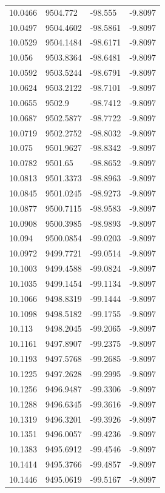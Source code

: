 \begin{table}[H]
\begin{tabular}{llll}
10.0466 & 9504.772 & -98.555 & -9.8097 \\
10.0497 & 9504.4602 & -98.5861 & -9.8097 \\
10.0529 & 9504.1484 & -98.6171 & -9.8097 \\
10.056 & 9503.8364 & -98.6481 & -9.8097 \\
10.0592 & 9503.5244 & -98.6791 & -9.8097 \\
10.0624 & 9503.2122 & -98.7101 & -9.8097 \\
10.0655 & 9502.9 & -98.7412 & -9.8097 \\
10.0687 & 9502.5877 & -98.7722 & -9.8097 \\
10.0719 & 9502.2752 & -98.8032 & -9.8097 \\
10.075 & 9501.9627 & -98.8342 & -9.8097 \\
10.0782 & 9501.65 & -98.8652 & -9.8097 \\
10.0813 & 9501.3373 & -98.8963 & -9.8097 \\
10.0845 & 9501.0245 & -98.9273 & -9.8097 \\
10.0877 & 9500.7115 & -98.9583 & -9.8097 \\
10.0908 & 9500.3985 & -98.9893 & -9.8097 \\
10.094 & 9500.0854 & -99.0203 & -9.8097 \\
10.0972 & 9499.7721 & -99.0514 & -9.8097 \\
10.1003 & 9499.4588 & -99.0824 & -9.8097 \\
10.1035 & 9499.1454 & -99.1134 & -9.8097 \\
10.1066 & 9498.8319 & -99.1444 & -9.8097 \\
10.1098 & 9498.5182 & -99.1755 & -9.8097 \\
10.113 & 9498.2045 & -99.2065 & -9.8097 \\
10.1161 & 9497.8907 & -99.2375 & -9.8097 \\
10.1193 & 9497.5768 & -99.2685 & -9.8097 \\
10.1225 & 9497.2628 & -99.2995 & -9.8097 \\
10.1256 & 9496.9487 & -99.3306 & -9.8097 \\
10.1288 & 9496.6345 & -99.3616 & -9.8097 \\
10.1319 & 9496.3201 & -99.3926 & -9.8097 \\
10.1351 & 9496.0057 & -99.4236 & -9.8097 \\
10.1383 & 9495.6912 & -99.4546 & -9.8097 \\
10.1414 & 9495.3766 & -99.4857 & -9.8097 \\
10.1446 & 9495.0619 & -99.5167 & -9.8097 \\

\end{tabular}
\end{table}

